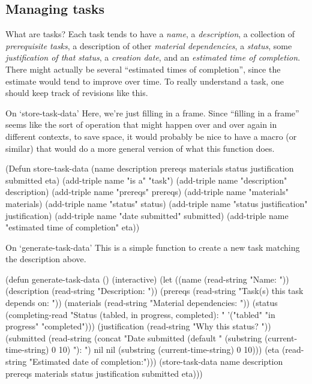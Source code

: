 \subsection{Managing tasks} \label{managing-tasks}

\begin{notate}{What are tasks?}
Each task tends to have a \emph{name}, a
\emph{description}, a collection of \emph{prerequisite
  tasks}, a description of other \emph{material
  dependencies}, a \emph{status}, some \emph{justification
  of that status}, a \emph{creation date}, and an
\emph{estimated time of completion}.  There might actually
be several ``estimated times of completion'', since the
estimate would tend to improve over time.  To really
understand a task, one should keep track of revisions like
this.
\end{notate}

\begin{notate}{On `store-task-data'} \label{store-task-data}
Here, we're just filling in a frame.  Since ``filling in a
frame'' seems like the sort of operation that might happen
over and over again in different contexts, to save space,
it would probably be nice to have a macro (or similar)
that would do a more general version of what this function
does.
\end{notate}

\begin{elisp}
(Defun store-task-data
  (name description prereqs materials status
        justification submitted eta)
  (add-triple name "is a" "task")
  (add-triple name "description" description)
  (add-triple name "prereqs" prereqs)
  (add-triple name "materials" materials)
  (add-triple name "status" status)
  (add-triple name "status justification" justification)
  (add-triple name "date submitted" submitted)
  (add-triple name "estimated time of completion" eta))
\end{elisp}

\begin{notate}{On `generate-task-data'} \label{generate-task-data}
This is a simple function to create a new task matching
the description above.
\end{notate}

\begin{elisp}
(defun generate-task-data ()
  (interactive)
  (let ((name (read-string "Name: "))
        (description (read-string "Description: "))
        (prereqs (read-string
                  "Task(s) this task depends on: "))
        (materials (read-string "Material dependencies: "))
        (status (completing-read
                 "Status (tabled, in progress, completed):
                 " '("tabled" "in progress" "completed")))
        (justification (read-string "Why this status? "))
        (submitted
         (read-string
          (concat "Date submitted (default "
                  (substring (current-time-string) 0 10)
                  "): ")
          nil nil (substring (current-time-string) 0 10)))
        (eta
         (read-string "Estimated date of completion:")))
    (store-task-data name description prereqs materials
                     status
                     justification submitted eta)))
\end{elisp}

